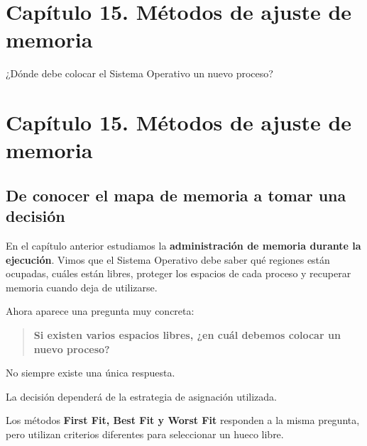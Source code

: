 \documentclass[
  spanish,
  letterpaper,
]{scrbook}
\begin{document}
\chapter{Capítulo 15. Métodos de ajuste de
memoria}\label{capuxedtulo-15.-muxe9todos-de-ajuste-de-memoria-2}

¿Dónde debe colocar el Sistema Operativo un nuevo proceso?

\hfill\break


\chapter{Capítulo 15. Métodos de ajuste de
memoria}\label{capuxedtulo-15.-muxe9todos-de-ajuste-de-memoria-3}

\section{De conocer el mapa de memoria a tomar una
decisión}\label{de-conocer-el-mapa-de-memoria-a-tomar-una-decisiuxf3n-1}

En el capítulo anterior estudiamos la \textbf{administración de memoria
durante la ejecución}. Vimos que el Sistema Operativo debe saber qué
regiones están ocupadas, cuáles están libres, proteger los espacios de
cada proceso y recuperar memoria cuando deja de utilizarse.

Ahora aparece una pregunta muy concreta:

\begin{quote}
\textbf{Si existen varios espacios libres, ¿en cuál debemos colocar un
nuevo proceso?}
\end{quote}

No siempre existe una única respuesta.

La decisión dependerá de la estrategia de asignación utilizada.

\begin{tcolorbox}[enhanced jigsaw, arc=.35mm, bottomrule=.15mm, bottomtitle=1mm, breakable, colback=white, colbacktitle=quarto-callout-tip-color!10!white, colframe=quarto-callout-tip-color-frame, coltitle=black, left=2mm, leftrule=.75mm, opacityback=0, opacitybacktitle=0.6, rightrule=.15mm, title=\textcolor{quarto-callout-tip-color}{\faLightbulb}\hspace{0.5em}{Idea central}, titlerule=0mm, toprule=.15mm, toptitle=1mm]

Los métodos \textbf{First Fit, Best Fit y Worst Fit} responden a la
misma pregunta, pero utilizan criterios diferentes para seleccionar un
hueco libre.

\end{tcolorbox}
\end{document}
